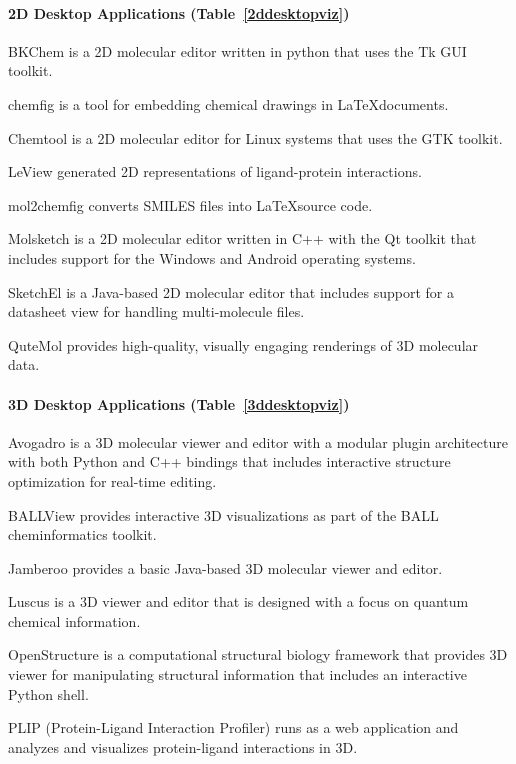 \paragraph{2D Desktop Applications (Table~\ref{2ddesktopviz})}

BKChem is a 2D molecular editor written in python that uses the Tk GUI toolkit.

chemfig is a tool for embedding chemical drawings in \LaTeX documents.

Chemtool is a 2D molecular editor for Linux systems that uses the GTK toolkit.

LeView \cite{Caboche_2013} generated 2D representations of ligand-protein interactions.

mol2chemfig \cite{Brefo_Mensah_2012} converts SMILES files into \LaTeX source code.

Molsketch is a 2D molecular editor written in C++ with the Qt toolkit that includes support for the Windows and Android operating systems.

SketchEl is a Java-based 2D molecular editor that includes support for a datasheet view for handling multi-molecule files.

QuteMol \cite{Tarini_2006} provides high-quality, visually engaging renderings of 3D molecular data.


\paragraph{3D Desktop Applications (Table~\ref{3ddesktopviz})}

Avogadro \cite{Hanwell_2012} is a 3D molecular viewer and editor with a modular plugin architecture with both Python and C++ bindings that includes interactive structure optimization for real-time editing. 

BALLView \cite{Moll_2005} provides interactive 3D visualizations as part of the BALL \cite{Hildebrandt_2010} cheminformatics toolkit.

Jamberoo provides a basic Java-based 3D molecular viewer and editor.

Luscus \cite{Kova_evi__2015} is a 3D viewer and editor that is designed with a focus on quantum chemical information.

OpenStructure \cite{Biasini_2013} is a computational structural biology framework that provides 3D viewer for manipulating structural information that includes an interactive Python shell.

PLIP (Protein-Ligand Interaction Profiler) \cite{Salentin_2015} runs as a web application and analyzes and visualizes protein-ligand interactions in 3D.

